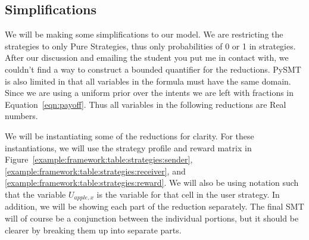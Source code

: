 \documentclass{article}
\begin{document}
\subsection{Simplifications}
\label{sec:simplifications}
We will be making some simplifications to our model. We are restricting the strategies to only Pure Strategies, thus only probabilities of 0 or 1 in strategies. After our discussion and emailing the student you put me in contact with, we couldn't find a way to construct a bounded quantifier for the reductions. PySMT is also limited in that all variables in the formula must have the same domain. Since we are using a uniform prior over the intents we are left with fractions in Equation~\ref{eqn:payoff}. Thus all variables in the following reductions are Real numbers.

We will be instantiating some of the reductions for clarity. For these instantiations, we will use the strategy profile and reward matrix in Figure~\ref{example:framework:table:strategies:sender}, \ref{example:framework:table:strategies:receiver}, and \ref{example:framework:table:strategies:reward}. We will also be using notation such that the variable $U_{apple,x}$ is the variable for that cell in the user strategy. In addition, we will be showing each part of the reduction separately. The final SMT will of course be a conjunction between the individual portions, but it should be clearer by breaking them up into separate parts. 
\end{document}
